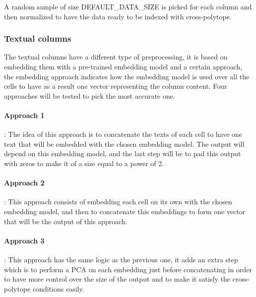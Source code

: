 A random sample of size \mbox{DEFAULT\_DATA\_SIZE} is picked for each column
and then normalized to have the data ready to be indexed with cross-polytope.

\subsubsection{Textual columns}
The textual columns have a different type of preprocessing, it is based on
embedding them with a pre-trained embedding model and a certain approach, the
embedding approach indicates how the embedding model is used over all the cells
to have as a result one vector representing the column content. Four approaches
will be tested to pick the most accurate one.

\paragraph{Approach 1}: The idea of this approach is to concatenate the texts of
each cell to have one text that will be embedded with the chosen embedding
model. The output will depend on this embedding model, and the last step will be
to pad this output with zeros to make it of a size equal to a power of 2.

\paragraph{Approach 2}: This approach consists of embedding each cell on its own
with the chosen embedding model, and then to concatenate this embeddings to form
one vector that will be the output of this approach.

\paragraph{Approach 3}: This approach has the same logic as the previous one, it
adds an extra step which is to perform a PCA on each embedding just before
concatenating in order to have more control over the size of the output and to
make it satisfy the cross-polytope conditions easily.

